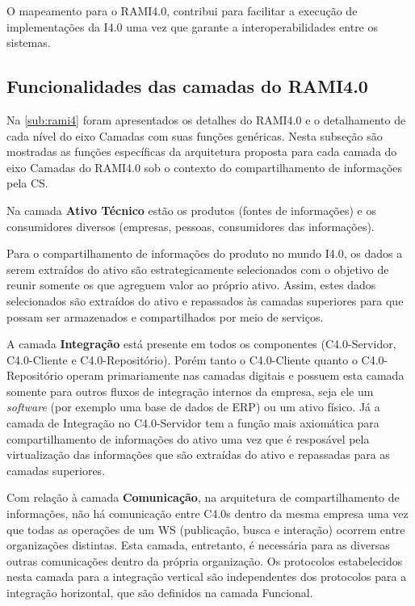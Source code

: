 O mapeamento para o RAMI4.0, contribui para facilitar a execução de implementações da I4.0 uma vez que garante a interoperabilidades entre os sistemas.

\subsection{Funcionalidades das camadas do RAMI4.0}

Na \autoref{sub:rami4} foram apresentados os detalhes do RAMI4.0 e o detalhamento de cada nível do eixo Camadas com suas funções genéricas. Nesta subseção são mostradas as funções específicas da arquitetura proposta para cada camada do eixo Camadas do RAMI4.0 sob o contexto do compartilhamento de informações pela CS.

Na camada \textbf{Ativo Técnico} estão os produtos (fontes de informações) e os consumidores diversos (empresas, pessoas, consumidores das informações).

Para o compartilhamento de informações do produto no mundo I4.0, os dados a serem extraídos do ativo são estrategicamente selecionados com o objetivo de reunir somente os que agreguem valor ao próprio ativo. Assim, estes dados selecionados são extraídos do ativo e repassados às camadas superiores para que possam ser armazenados e compartilhados por meio de serviços.

A camada \textbf{Integração} está presente em todos os componentes (C4.0-Servidor, C4.0-Cliente e C4.0-Repositório). Porém tanto o C4.0-Cliente quanto o C4.0-Repositório operam primariamente nas camadas digitais e possuem esta camada somente para outros fluxos de integração internos da empresa, seja ele um \textit{software} (por exemplo uma base de dados de ERP) ou um ativo físico. Já a camada de Integração no C4.0-Servidor tem a função mais axiomática para compartilhamento de informações do ativo uma vez que é resposável pela virtualização das informações que são extraídas do ativo e repassadas para as camadas superiores.

Com relação à camada \textbf{Comunicação}, na arquitetura de compartilhamento de informações, não há comunicação entre C4.0s dentro da mesma empresa uma vez que todas as operações de um WS (publicação, busca e interação) ocorrem entre organizações distintas. Esta camada, entretanto, é necessária para as diversas outras comunicações dentro da própria organização. Os protocolos estabelecidos nesta camada para a integração vertical são independentes dos protocolos para a integração horizontal, que são definidos na camada Funcional.

